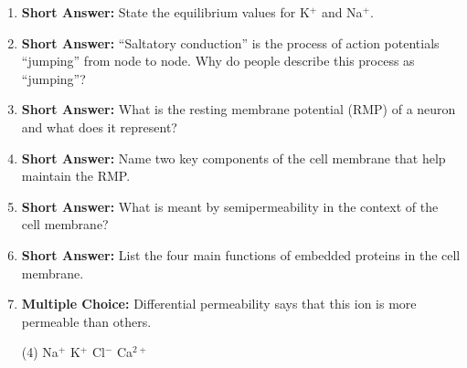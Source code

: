 \begin{enumerate}[label=\textbf{Q2.3.\arabic*}]
      \item \textbf{Short Answer:} State the equilibrium values for K\(^{+}\) and Na\(^{+}\). \\

      \item \textbf{Short Answer:} ``Saltatory conduction'' is the process of action potentials ``jumping'' from node to node. Why do people describe this process as ``jumping''? \\

      \item \textbf{Short Answer:} What is the resting membrane potential (RMP) of a neuron and what does it represent? \\ 

      \item \textbf{Short Answer:} Name two key components of the cell membrane that help maintain the RMP. \\

      \item \textbf{Short Answer:} What is meant by semipermeability in the context of the cell membrane? \\

      \item \textbf{Short Answer:} List the four main functions of embedded proteins in the cell membrane. \\

      \item \textbf{Multiple Choice:} Differential permeability says that this ion is more permeable than others. 
      \begin{tasks}[label=(\Alph*), label-width=1.5em, item-indent=1.7em](4)
            \task Na\(^{+}\)
            \task K\(^{+}\)
            \task Cl\(^{-}\)
            \task Ca\(^{2+}\)
      \end{tasks}


\end{enumerate}
